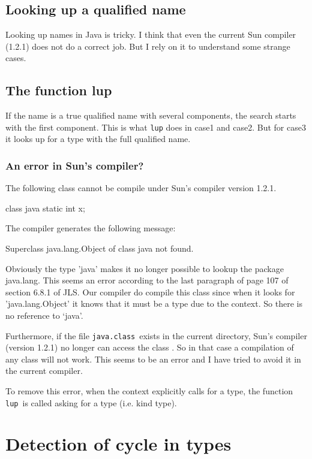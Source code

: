\documentclass{book}
\newcommand{\func}[1]{\verb+#1+}
\newcommand{\classfile}[1]{\verb+#1+}
\begin{document}
\subsection{Looking up a qualified name}

Looking up names in Java is tricky. I think that even the current Sun
compiler (1.2.1) does not do a correct job. But I rely on it to
understand some strange cases.

\subsection{The function lup}

If the name is a true qualified name with several components, the
search starts with the first component. This is what \func{lup} does
in case1 and case2. But for case3 it looks up for a type with the full
qualified name.

\subsubsection{An error in Sun's compiler?}

The following class cannot be compile under Sun's compiler version
1.2.1.

class java { static int x; }

The compiler generates the following message:

  Superclass java.lang.Object of class java not found. 

Obviously the type 'java' makes it no longer possible to lookup the
package java.lang. This seems an error according to the last paragraph
of page 107 of section 6.8.1 of JLS. Our compiler do compile this
class since when it looks for 'java.lang.Object' it knows that it must
be a type due to the context. So there is no reference to `java'.

Furthermore, if the file \classfile{java.class}\ exists in the current
directory, Sun's compiler (version 1.2.1) no longer can access the
class . So in that case a compilation of any
class will not work. This seems to be an error and I have tried to
avoid it in the current compiler. 

To remove this error, when the context explicitly calls for a type,
the function \func{lup}\ is called asking for a type (i.e. kind type).

\section{Detection of cycle in types}
\end{document}
